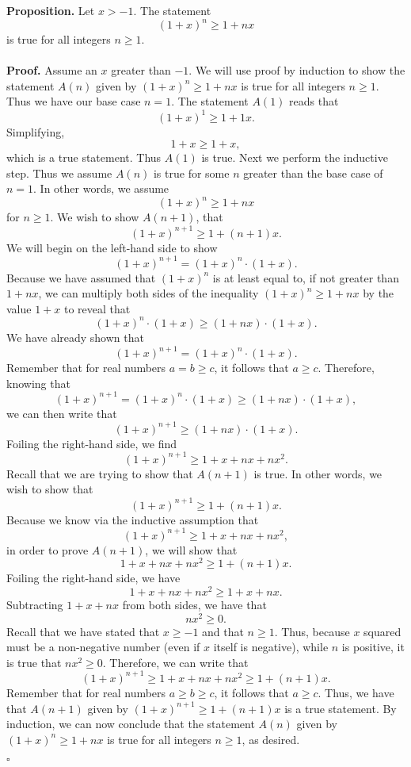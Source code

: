 \documentclass[12pt]{exam}
\begin{document}
\begin{questions}
\question
\textbf{Proposition.} Let $x > -1$. The statement $$(1+x)^n \geq 1+nx$$ is true for all integers $n \geq 1.$ 
\\
\\\textbf{Proof.} Assume an $x$ greater than $-1$. We will use proof by induction to show the statement $A(n)$ given by $(1+x)^n \geq 1+nx$ is true for all integers $n \geq 1$. Thus we have our base case $n=1$. The statement $A(1)$ reads that $$(1+x)^1 \geq 1+1x.$$ Simplifying, $$1+x \geq 1+x,$$ which is a true statement. Thus $A(1)$ is true. Next we perform the inductive step. Thus we assume $A(n)$ is true for some $n$ greater than the base case of $n=1$. In other words, we assume  $$(1+x)^n \geq 1+nx $$ for $n \geq 1$. We wish to show $A(n+1)$, that $$(1+x)^{n+1} \geq 1+(n+1)x.$$ We will begin on the left-hand side to show $$(1+x)^{n+1} = (1+x)^n \cdot (1+x).$$ Because we have assumed that $(1+x)^n$ is at least equal to, if not greater than $1+nx$, we can multiply both sides of the inequality $(1+x)^n \geq 1+nx$ by the value $1+x$ to reveal that $$(1+x)^n \cdot (1+x) \geq (1+nx) \cdot (1+x).$$ We have already shown that $$(1+x)^{n+1} = (1+x)^n \cdot (1+x).$$ Remember that for real numbers $a = b\geq c$, it follows that $a\geq c$. Therefore, knowing that $$(1+x)^{n+1} = (1+x)^n \cdot (1+x) \geq (1+nx) \cdot (1+x),$$  we can then write that  $$(1+x)^{n+1} \geq (1+nx) \cdot (1+x).$$ Foiling the right-hand side, we find $$(1+x)^{n+1} \geq 1+ x + nx + nx^2.$$ Recall that we are trying to show that $A(n+1)$ is true. In other words, we wish to show that $$(1+x)^{n+1} \geq 1+(n+1)x.$$ Because we know via the inductive assumption that $$(1+x)^{n+1} \geq 1+ x + nx + nx^2,$$ in order to prove $A(n+1)$, we will show that $$1+ x + nx + nx^2 \geq 1+(n+1)x.$$ Foiling the right-hand side, we have $$1+ x + nx + nx^2 \geq 1+ x + nx.$$ Subtracting $1+ x + nx$ from both sides, we have that $$nx^2 \geq 0.$$ Recall that we have stated that $x \geq -1$ and that $n \geq 1$. Thus, because $x$ squared must be a non-negative number (even if $x$ itself is negative), while $n$ is positive, it is true that $nx^2 \geq 0$. Therefore, we can write that $$(1+x)^{n+1} \geq 1+ x + nx + nx^2 \geq 1+(n+1)x.$$ Remember that for real numbers $a \geq b\geq c$, it follows that $a\geq c$. Thus, we have that $A(n+1)$ given by $(1+x)^{n+1} \geq 1+(n+1)x$ is a true statement. By induction, we can now conclude that the statement $A(n)$ given by $(1+x)^n \geq 1+nx$ is true for all integers $n \geq 1$, as desired.
\begin{flushright}
$\square$
\end{flushright}

\end{questions}
\end{document}
